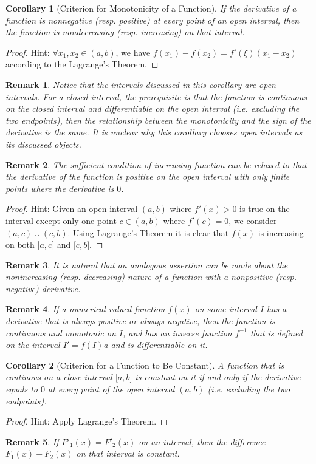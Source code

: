 \documentclass[onecolumn]{ctexart}
\newtheorem{corollary}{Corollary}
\newtheorem{remark}{Remark}
\begin{document}
\begin{corollary}[Criterion for Monotonicity of a Function]
  If the derivative of a function is nonnegative (resp. positive) at every point 
  of an open interval, then the function is nondecreasing (resp. increasing) on 
  that interval.
\end{corollary}
\begin{proof}
  Hint: $\forall x_1, x_2 \in (a, b)$, we have $f(x_1) - f(x_2) = 
  f'(\xi)(x_1 - x_2)$ according to the Lagrange's Theorem.
\end{proof}
\begin{remark}
  Notice that the intervals discussed in this corollary are open intervals. For 
  a closed interval, the prerequisite is that the function is continuous on the 
  closed interval and differentiable on the open interval (i.e. excluding the 
  two endpoints), then the relationship between the monotonicity and the sign of 
  the derivative is the same. It is unclear why this corollary chooses open 
  intervals as its discussed objects.
\end{remark}
\begin{remark}
  The sufficient condition of increasing function can be relaxed to that the 
  derivative of the function is positive on the open interval with only finite 
  points where the derivative is $0$.
\end{remark}
\begin{proof}
  Hint: Given an open interval $(a, b)$ where $f'(x) > 0$ is true on the 
  interval except only one point $c \in (a, b)$ where $f'(c) = 0$, we consider 
  $(a, c) \cup (c, b)$. Using Lagrange's Theorem it is clear that $f(x)$ is 
  increasing on both $\lbrack a, c \rbrack$ and $\lbrack c, b \rbrack$.
\end{proof}
\begin{remark}
  It is natural that an analogous assertion can be made about the nonincreasing 
  (resp. decreasing) nature of a function with a nonpositive (resp. negative) 
  derivative.
\end{remark}
\begin{remark}
  If a numerical-valued function $f(x)$ on some interval $I$ has a derivative 
  that is always positive or always negative, then the function is continuous 
  and monotonic on $I$, and has an inverse function $f^{-1}$ that is defined on 
  the interval $I' = f(I)$a and is differentiable on it.
\end{remark}

\begin{corollary}[Criterion for a Function to Be Constant]
  A function that is continous on a close interval $\lbrack a, b \rbrack$ is 
  constant on it if and only if the derivative equals to $0$ at every point of 
  the open interval $(a, b)$ (i.e. excluding the two endpoints).
\end{corollary}
\begin{proof}
  Hint: Apply Lagrange's Theorem.
\end{proof}
\begin{remark}
  If $F'_1(x) = F'_2(x)$ on an interval, then the difference $F_1(x) - F_2(x)$ 
  on that interval is constant.
\end{remark}
\end{document}
